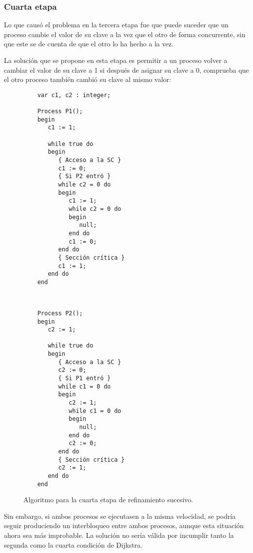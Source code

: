 \subsubsection{Cuarta etapa}
Lo que causó el problema en la tercera etapa fue que puede suceder que un proceso cambie el valor de su clave a la vez que el otro de forma concurrente, sin que este se de cuenta de que el otro lo ha hecho a la vez.

La solución que se propone en esta etapa es permitir a un proceso volver a cambiar el valor de su clave a 1 si después de asignar su clave a 0, comprueba que el otro proceso también cambió su clave al mismo valor:
\begin{figure}[H]
\setlength{\columnsep}{1cm}
\begin{multicols}{2}
    \begin{verbatim}
    var c1, c2 : integer;

    Process P1();
    begin
       c1 := 1;

       while true do
       begin
          { Acceso a la SC }
          c1 := 0;
          { Si P2 entró }
          while c2 = 0 do
          begin
             c1 := 1;
             while c2 = 0 do
             begin
                null;
             end do
             c1 := 0;
          end do
          { Sección crítica }
          c1 := 1;
       end do
    end
\end{verbatim}
\begin{verbatim}


    Process P2();
    begin
       c2 := 1;

       while true do
       begin
          { Acceso a la SC }
          c2 := 0;
          { Si P1 entró }
          while c1 = 0 do
          begin
             c2 := 1;
             while c1 = 0 do
             begin
                null;
             end do
             c2 := 0;
          end do
          { Sección crítica }
          c2 := 1;
       end do
    end
\end{verbatim}
\end{multicols}
\caption{Algoritmo para la cuarta etapa de refinamiento sucesivo.}
\end{figure}
Sin embargo, si ambos procesos se ejecutasen a la misma velocidad, se podría seguir produciendo un interbloqueo entre ambos procesos, aunque esta situación ahora sea más improbable. La solución no sería válida por incumplir tanto la segunda como la cuarta condición de Dijkstra.\\

